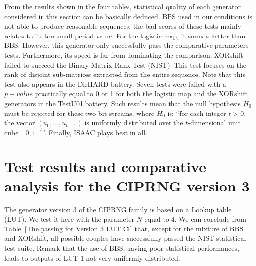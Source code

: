 From the results shown in the four tables, statistical quality of each generator 
considered in this section can be basically deduced. 
BBS used in our conditions is not able to
produce reasonable sequences, the bad scores of these tests mainly relates to its too small period value. 
For the logistic map, it sounds better than BBS. However, this generator only successfully pass the comparative parameters tests.
Furthermore, its speed is far from dominating the comparison. 
XORshift failed to succeed the Binary Matrix Rank Test (NIST). 
This test focuses on the rank of disjoint 
sub-matrices extracted from the entire sequence. 
Note that this 
test also appears in the DieHARD battery. 
Seven tests were failed with a $p-value$ practically equal to 
0 or 1 for both the logistic map and the XORshift generators in the TestU01 battery. 
Such results mean that the 
null hypothesis $H_0$ must be rejected for these two bit streams, where $H_0$ is: ``for each integer $t>0$, the vector $(u_0 , ..., u_{t-1})$ is uniformly 
distributed over the $t$-dimensional unit cube $[0, 1]^t$''.
Finally, ISAAC plays best in all.

\section{Test results and comparative analysis for the CIPRNG version 3}
\label{Results of NISTfor Version 3 CI}
 
The generator version 3 
of the CIPRNG family is based on a 
Lookup table (LUT).
We test it here with the parameter $N$
equal to $4$.
We can conclude from Table~\ref{The passing for Version 3 LUT CI} that, except for the mixture of BBS and XORshift, all 
possible couples have successfully passed the NIST statistical test suite. 
Remark that the use of BBS, having poor statistical performances, leads to outputs of LUT-1 not very uniformly distributed. 

